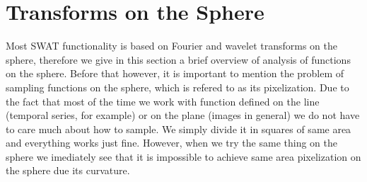 \documentclass[12pt]{article}
\begin{document}
\section{Transforms on the Sphere}
Most SWAT functionality is based on Fourier and wavelet transforms on the sphere, therefore we give
in this section a brief overview of analysis of functions on the sphere. Before
that however, it is important to mention the problem of sampling functions on
the sphere, which is refered to as its pixelization.  Due to the fact
that most of the time we work with function defined on the line (temporal
series, for example) or on the plane (images in general) we do not have to care
much about how to sample. We simply divide it in squares of same area and everything works
just fine. However, when we try the same thing on the sphere we imediately see
that it is impossible to achieve same area pixelization on the sphere due its curvature.
\end{document}
